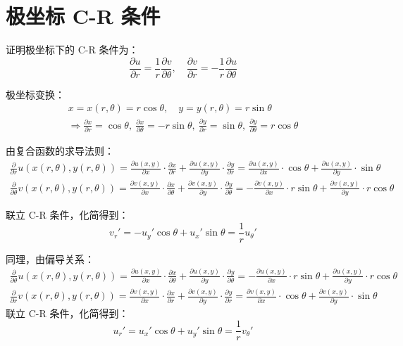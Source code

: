 \documentclass[UTF8]{report}
\theoremstyle{MyLineTheoremStyle} %
\theoremstyle{MyBlockTheoremStyle} %
\theoremstyle{MySubsubsectionStyle} %
\begin{document}
\section{极坐标 C-R 条件}
证明极坐标下的 C-R 条件为：
\begin{equation*}
\frac{\partial u }{\partial r } = \frac{1}{r}\frac{\partial v }{\partial \theta }, \quad \frac{\partial v }{\partial r } = -\frac{1}{r}\frac{\partial u }{\partial \theta } 
\end{equation*}

极坐标变换：
\begin{gather*}
    x = x(r,\theta ) = r\cos \theta, \quad y = y(r,\theta ) = r\sin \theta  \\ \Longrightarrow 
    \frac{\partial x }{\partial r } = \cos \theta,\ \frac{\partial x }{\partial \theta } = -r\sin \theta,\ \frac{\partial y }{\partial r } = \sin \theta,\ \frac{\partial y }{\partial \theta } = r\cos \theta
\end{gather*}

由复合函数的求导法则：
\begin{gather*}
\frac{\partial  }{\partial r }u\left(x(r, \theta),y(r, \theta)\right) 
= \frac{\partial u(x,y) }{\partial x }\cdot\frac{\partial x}{\partial r } + \frac{\partial u(x,y) }{\partial y}\cdot\frac{\partial y}{\partial r } 
= \frac{\partial u(x,y) }{\partial x }\cdot \cos \theta + \frac{\partial u(x,y) }{\partial y}\cdot \sin \theta 
\\
\frac{\partial  }{\partial \theta }v\left(x(r, \theta),y(r, \theta)\right) 
= \frac{\partial v(x,y) }{\partial x }\cdot\frac{\partial x}{\partial \theta } + \frac{\partial v(x,y) }{\partial y}\cdot\frac{\partial y}{\partial \theta } 
= - \frac{\partial v(x,y) }{\partial x } \cdot r\sin \theta + \frac{\partial v(x,y) }{\partial y}\cdot r \cos \theta 
\end{gather*}



联立 C-R 条件，化简得到：
\begin{equation*}
v_r' = -u_y'\cos \theta + u_x' \sin \theta = \frac{1}{r}u_\theta'
\end{equation*}

同理，由偏导关系：
\begin{gather*}
\frac{\partial  }{\partial \theta }u\left(x(r, \theta),y(r, \theta)\right) 
= \frac{\partial u(x,y) }{\partial x }\cdot\frac{\partial x}{\partial \theta } + \frac{\partial u(x,y) }{\partial y}\cdot\frac{\partial y}{\partial \theta } 
= - \frac{\partial u(x,y) }{\partial x } \cdot r\sin \theta + \frac{\partial u(x,y) }{\partial y}\cdot r \cos \theta 
\\ 
\frac{\partial  }{\partial r }v\left(x(r, \theta),y(r, \theta)\right) 
= \frac{\partial v(x,y) }{\partial x }\cdot\frac{\partial x}{\partial r } + \frac{\partial v(x,y) }{\partial y}\cdot\frac{\partial y}{\partial r } 
= \frac{\partial v(x,y) }{\partial x }\cdot \cos \theta + \frac{\partial v(x,y) }{\partial y}\cdot \sin \theta 
\end{gather*}
联立 C-R 条件，化简得到：
\begin{equation*}
u_r' = u_x'\cos \theta + u_y' \sin \theta = \frac{1}{r}v_\theta'
\end{equation*}
\end{document}
